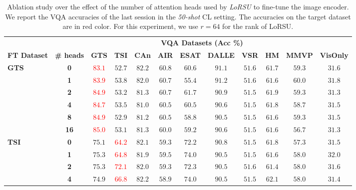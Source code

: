 \begin{table}
\caption{Ablation study over the effect of the number of attention heads used by \emph{LoRSU} to fine-tune the image encoder. We report the VQA accuracies of the last session in the \emph{50-shot} CL setting. The accuracies on the target dataset are in red color. For this experiment, we use $r=64$ for the rank of LoRSU.}
 \label{table:ablation_heads}
 \vskip 0.15in
\begin{center}
\begingroup
\setlength{\tabcolsep}{6.7pt}
\begin{tabular}{l c c c c c c c c c c c}
\toprule
 & & \multicolumn{9}{c}{\textbf{VQA Datasets (Acc \%)}}  \\
\cmidrule(lr){3-12}
\textbf{FT Dataset} & \textbf{\# heads}  & \textbf{GTS} & \textbf{TSI} & \textbf{CAn} & \textbf{AIR} & \textbf{ESAT} & \textbf{DALLE} & \textbf{VSR} & \textbf{HM} & \textbf{MMVP} & \textbf{VisOnly} \\
\midrule
\multirow{6}{*}{\textbf{GTS}} & \textbf{0} & \textcolor{red}{$83.1$} & $52.7$ & $82.2$ & $60.8$ & $60.6$ & $91.1$ & $51.6$ & $61.7$ & $59.3$ & $31.6$ \\
 & \textbf{1} &  \textcolor{red}{$83.9$} & $53.8$ & $82.0$ & $60.7$ & $55.4$ & $91.2$ & $51.6$ & $61.6$ & $60.0$ & $31.8$ \\
 & \textbf{2} &  \textcolor{red}{$84.9$} & $53.2$ & $81.3$ & $60.7$ & $61.7$ & $90.9$ & $51.5$ & $61.9$ & $59.3$ & $31.3$ \\
 & \textbf{4} &  \textcolor{red}{$84.7$} & $53.5$ & $81.0$ & $60.5$ & $60.5$ & $90.6$ & $51.5$ & $61.8$ & $58.7$ & $31.5$ \\
 & \textbf{8} &  \textcolor{red}{$84.9$} & $52.9$ & $81.2$ & $60.5$ & $58.8$ & $90.5$ & $51.5$ & $61.6$ & $59.3$ & $31.5$ \\
 & \textbf{16} &  \textcolor{red}{$85.0$} & $53.1$ & $81.3$ & $60.0$ & $59.2$ & $90.6$ & $51.5$ & $61.6$ & $56.7$ & $31.3$ \\
\midrule
\multirow{6}{*}{\textbf{TSI}} & \textbf{0} & $75.1$ &  \textcolor{red}{$64.2$} & $82.1$ & $59.3$ & $72.2$ & $90.8$ & $51.5$ & $61.8$ & $57.3$ & $31.5$ \\
 & \textbf{1} & $75.3$ &  \textcolor{red}{$64.8$} & $81.9$ & $59.5$ & $74.0$ & $90.5$ & $51.5$ & $61.6$ & $58.0$ & $32.0$ \\
 & \textbf{2} & $75.3$ &  \textcolor{red}{$72.1$} & $82.0$ & $59.3$ & $72.3$ & $90.5$ & $51.6$ & $61.4$ & $58.0$ & $31.6$ \\
 & \textbf{4} & $74.9$ &  \textcolor{red}{$66.8$} & $82.2$ & $58.9$ & $74.0$ & $90.5$ & $51.5$ & $62.1$ & $58.0$ & $31.4$ \\

\end{tabular}
\end{center}
\end{table}

